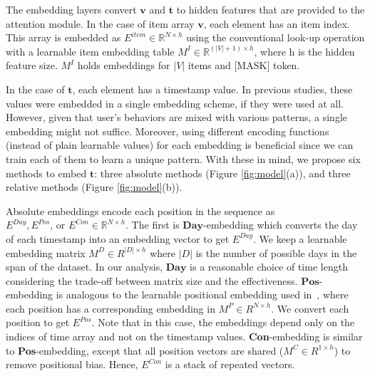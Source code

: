 The embedding layers convert $\mathbf{v}$ and $\mathbf{t}$ to hidden features that are provided to the attention module. In the case of item array $\mathbf{v}$, each element has an item index. This array is embedded as $E^{item} \in \mathbb{R}^ {N\times h}$ using the conventional look-up operation with a learnable item embedding table $M^I\in \mathbb{R}^{(|V|+1)\times h}$, where h is the hidden feature size. $M^I$ holds embeddings for $|V|$ items and [MASK] token.

In the case of $\mathbf{t}$, each element has a timestamp value.
In previous studies, these values were embedded in a single embedding scheme, if they were used at all. However, given that user's behaviors are mixed with various patterns, a single embedding might not suffice. Moreover, using different encoding functions (instead of plain learnable values) for each embedding is beneficial since we can train each of them to learn a unique pattern. With these in mind, we propose six methods to embed $\mathbf{t}$: three absolute methods (Figure \ref{fig:model}(a)), and three relative methods (Figure \ref{fig:model}(b)).

Absolute embeddings encode each position in the sequence as $E^{Day}, E^{Pos}\text{, or } E^{Con} \in \mathbb{R}^{N \times h}$. The first is $\textbf{Day}$-embedding which converts the day of each timestamp into an embedding vector to get $E^{Day}$. We keep a learnable embedding matrix $M^D\in R^{|D|\times h}$ where $|D|$ is the number of possible days in the span of the dataset. In our analysis, $\textbf{Day}$ is a reasonable choice of time length considering the trade-off between matrix size and the effectiveness. $\textbf{Pos}$-embedding is analogous to the learnable positional embedding used in~\cite{BERT, BERT4Rec}, where each position has a corresponding embedding in $M^P\in R^{N\times h}$. We convert each position to get $E^{Pos}$. Note that in this case, the embeddings depend only on the indices of time array and not on the timestamp values. \textbf{Con}-embedding is similar to \textbf{Pos}-embedding, except that all position vectors are shared ($M^C\in R^{1\times h}$) to remove positional bias. Hence, $E^{Con}$ is a stack of repeated vectors.


